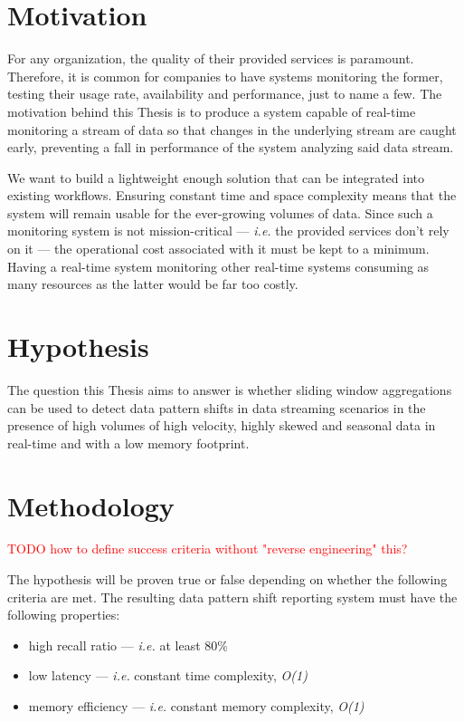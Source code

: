 \section{Motivation} \label{sec:motivation}
For any organization, the quality of their provided services is paramount. Therefore, it is common for companies to have systems monitoring the former, testing their usage rate, availability and performance, just to name a few. The motivation behind this Thesis is to produce a system capable of real-time monitoring a stream of data so that changes in the underlying stream are caught early, preventing a fall in performance of the system analyzing said data stream. 

We want to build a lightweight enough solution that can be integrated into existing workflows. Ensuring constant time and space complexity means that the system will remain usable for the ever-growing volumes of data. Since such a monitoring system is not mission-critical --- \textit{i.e.} the provided services don't rely on it --- the operational cost associated with it must be kept to a minimum. Having a real-time system monitoring other real-time systems consuming as many resources as the latter would be far too costly.

\section{Hypothesis} \label{sec:hypothesis}
The question this Thesis aims to answer is whether sliding window aggregations can be used to detect data pattern shifts in data streaming scenarios in the presence of high volumes of high velocity, highly skewed and seasonal data in real-time and with a low memory footprint.

\section{Methodology} \label{sec:methodology}

\textcolor{red}{TODO how to define success criteria without "reverse engineering" this?}

The hypothesis will be proven true or false depending on whether the following criteria are met. The resulting data pattern shift reporting system must have the following properties:
\begin{itemize}
    \item high recall ratio --- \textit{i.e.} at least 80\%
    \item low latency --- \textit{i.e.} constant time complexity, \textit{O(1)}
    \item memory efficiency --- \textit{i.e.} constant memory complexity, \textit{O(1)}
\end{itemize}

